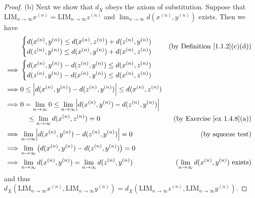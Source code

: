 \begin{proof}{(b)}
    Next we show that \(d_{\overline{X}}\) obeys the axiom of substitution.
    Suppose that \(\text{LIM}_{n \to \infty} x^{(n)} = \text{LIM}_{n \to \infty} z^{(n)}\) and \(\lim_{n \to \infty} d(x^{(n)}, y^{(n)})\) exists.
    Then we have
    \begin{align*}
                 & \begin{cases}
            d(x^{(n)}, y^{(n)}) \leq d(x^{(n)}, z^{(n)}) + d(z^{(n)}, y^{(n)}) \\
            d(z^{(n)}, y^{(n)}) \leq d(x^{(n)}, y^{(n)}) + d(x^{(n)}, z^{(n)})
        \end{cases}                                                                          & \text{(by Definition \ref{1.1.2}(c)(d))}                    \\
        \implies & \begin{cases}
            d(x^{(n)}, y^{(n)}) - d(z^{(n)}, y^{(n)}) \leq d(x^{(n)}, z^{(n)}) \\
            d(z^{(n)}, y^{(n)}) - d(x^{(n)}, y^{(n)}) \leq d(x^{(n)}, z^{(n)})
        \end{cases}                                                                                                                                        \\
        \implies & 0 \leq \abs*{d(x^{(n)}, y^{(n)}) - d(z^{(n)}, y^{(n)})} \leq d(x^{(n)}, z^{(n)})                                                                                  \\
        \implies & 0 = \lim_{n \to \infty} 0 \leq \lim_{n \to \infty} \abs*{d(x^{(n)}, y^{(n)}) - d(z^{(n)}, y^{(n)})}                                                               \\
                 & \quad \leq \lim_{n \to \infty} d(x^{(n)}, z^{(n)}) = 0                                              & \text{(by Exercise \ref{ex 1.4.8}(a))}                      \\
        \implies & \lim_{n \to \infty} \abs*{d(x^{(n)}, y^{(n)}) - d(z^{(n)}, y^{(n)})} = 0                            & \text{(by squeeze test)}                                    \\
        \implies & \lim_{n \to \infty} \big(d(x^{(n)}, y^{(n)}) - d(z^{(n)}, y^{(n)})\big) = 0                                                                                       \\
        \implies & \lim_{n \to \infty} d(x^{(n)}, y^{(n)}) = \lim_{n \to \infty} d(z^{(n)}, y^{(n)})                   & \text{(\(\lim_{n \to \infty} d(x^{(n)}, y^{(n)})\) exists)}
    \end{align*}
    and thus \(d_{\overline{X}}(\text{LIM}_{n \to \infty} x^{(n)}, \text{LIM}_{n \to \infty} y^{(n)}) = d_{\overline{X}}(\text{LIM}_{n \to \infty} z^{(n)}, \text{LIM}_{n \to \infty} y^{(n)})\).


\end{proof}
